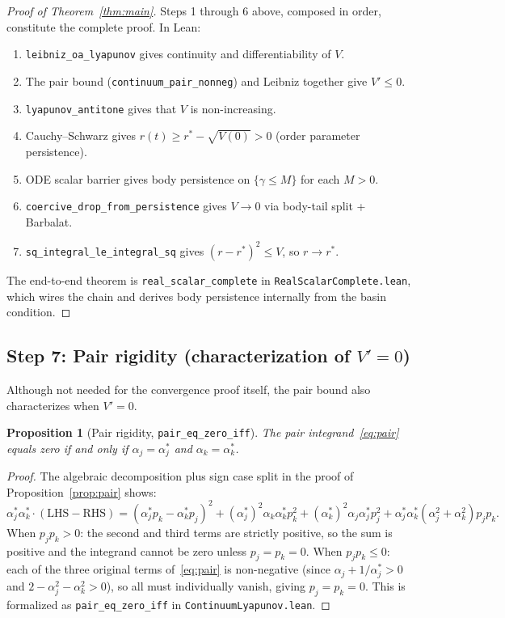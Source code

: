 \documentclass[11pt,a4paper]{article}
\newtheorem{proposition}[theorem]{Proposition}
\theoremstyle{definition}
\begin{document}
\begin{proof}[Proof of Theorem~\ref{thm:main}]
Steps 1 through 6 above, composed in order, constitute the complete proof. In Lean:
\begin{enumerate}[label=(\arabic*)]
\item \texttt{leibniz\_oa\_lyapunov} gives continuity and differentiability of $V$.
\item The pair bound (\texttt{continuum\_pair\_nonneg}) and Leibniz together give $V' \leq 0$.
\item \texttt{lyapunov\_antitone} gives that $V$ is non-increasing.
\item Cauchy--Schwarz gives $r(t) \geq r^* - \sqrt{V(0)} > 0$ (order parameter persistence).
\item ODE scalar barrier gives body persistence on $\{\gamma \leq M\}$ for each $M > 0$.
\item \texttt{coercive\_drop\_from\_persistence} gives $V \to 0$ via body-tail split + Barbalat.
\item \texttt{sq\_integral\_le\_integral\_sq} gives $(r-r^*)^2 \leq V$, so $r \to r^*$.
\end{enumerate}
The end-to-end theorem is \texttt{real\_scalar\_complete} in \texttt{RealScalarComplete.lean}, which wires the chain and derives body persistence internally from the basin condition.
\end{proof}

\subsection{Step 7: Pair rigidity (characterization of $V' = 0$)}\label{sec:rigidity}

Although not needed for the convergence proof itself, the pair bound also characterizes when $V' = 0$.

\begin{proposition}[Pair rigidity, \texttt{pair\_eq\_zero\_iff}]\label{prop:rigidity}
The pair integrand~\eqref{eq:pair} equals zero if and only if $\alpha_j = \alpha^*_j$ and $\alpha_k = \alpha^*_k$.
\end{proposition}

\begin{proof}
The algebraic decomposition plus sign case split in the proof of Proposition~\ref{prop:pair} shows:
\[
\alpha^*_j \alpha^*_k \cdot (\text{LHS}-\text{RHS}) = (\alpha^*_j p_k - \alpha^*_k p_j)^2 + (\alpha^*_j)^2 \alpha_k \alpha^*_k p_k^2 + (\alpha^*_k)^2 \alpha_j \alpha^*_j p_j^2 + \alpha^*_j \alpha^*_k (\alpha_j^2+\alpha_k^2) p_j p_k.
\]
When $p_j p_k > 0$: the second and third terms are strictly positive, so the sum is positive and the integrand cannot be zero unless $p_j = p_k = 0$.
When $p_j p_k \leq 0$: each of the three original terms of~\eqref{eq:pair} is non-negative (since $\alpha_j + 1/\alpha^*_j > 0$ and $2 - \alpha_j^2 - \alpha_k^2 > 0$), so all must individually vanish, giving $p_j = p_k = 0$.
This is formalized as \texttt{pair\_eq\_zero\_iff} in \texttt{ContinuumLyapunov.lean}.
\end{proof}
\end{document}
